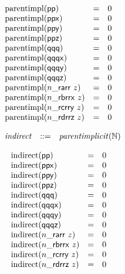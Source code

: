 $$
\begin{array}{@{}lcl@{}l@{}}
{\mathrm{parentimpl}}(\mathsf{pp}) &=& 0 \\
{\mathrm{parentimpl}}(\mathsf{ppx}) &=& 0 \\
{\mathrm{parentimpl}}(\mathsf{ppy}) &=& 0 \\
{\mathrm{parentimpl}}(\mathsf{ppz}) &=& 0 \\
{\mathrm{parentimpl}}(\mathsf{qqq}) &=& 0 \\
{\mathrm{parentimpl}}(\mathsf{qqqx}) &=& 0 \\
{\mathrm{parentimpl}}(\mathsf{qqqy}) &=& 0 \\
{\mathrm{parentimpl}}(\mathsf{qqqz}) &=& 0 \\
{\mathrm{parentimpl}}({n}{\mathsf{\_}}{\mathsf{ra}}{\mathsf{rr}}~z) &=& 0 \\
{\mathrm{parentimpl}}({n}{\mathsf{\_}}{\mathsf{rb}}{\mathsf{rrx}}~z) &=& 0 \\
{\mathrm{parentimpl}}({n}{\mathsf{\_}}{\mathsf{rc}}{\mathsf{rry}}~z) &=& 0 \\
{\mathrm{parentimpl}}({n}{\mathsf{\_}}{\mathsf{rd}}{\mathsf{rrz}}~z) &=& 0 \\
\end{array}
$$

$$
\begin{array}{@{}lrrl@{}l@{}}
& {\mathit{indirect}} &::=& {\mathit{parentimplicit}}(\mathbb{N}) \\
\end{array}
$$

$$
\begin{array}{@{}lcl@{}l@{}}
{\mathrm{indirect}}(\mathsf{pp}) &=& 0 \\
{\mathrm{indirect}}(\mathsf{ppx}) &=& 0 \\
{\mathrm{indirect}}(\mathsf{ppy}) &=& 0 \\
{\mathrm{indirect}}(\mathsf{ppz}) &=& 0 \\
{\mathrm{indirect}}(\mathsf{qqq}) &=& 0 \\
{\mathrm{indirect}}(\mathsf{qqqx}) &=& 0 \\
{\mathrm{indirect}}(\mathsf{qqqy}) &=& 0 \\
{\mathrm{indirect}}(\mathsf{qqqz}) &=& 0 \\
{\mathrm{indirect}}({n}{\mathsf{\_}}{\mathsf{ra}}{\mathsf{rr}}~z) &=& 0 \\
{\mathrm{indirect}}({n}{\mathsf{\_}}{\mathsf{rb}}{\mathsf{rrx}}~z) &=& 0 \\
{\mathrm{indirect}}({n}{\mathsf{\_}}{\mathsf{rc}}{\mathsf{rry}}~z) &=& 0 \\
{\mathrm{indirect}}({n}{\mathsf{\_}}{\mathsf{rd}}{\mathsf{rrz}}~z) &=& 0 \\
\end{array}
$$

